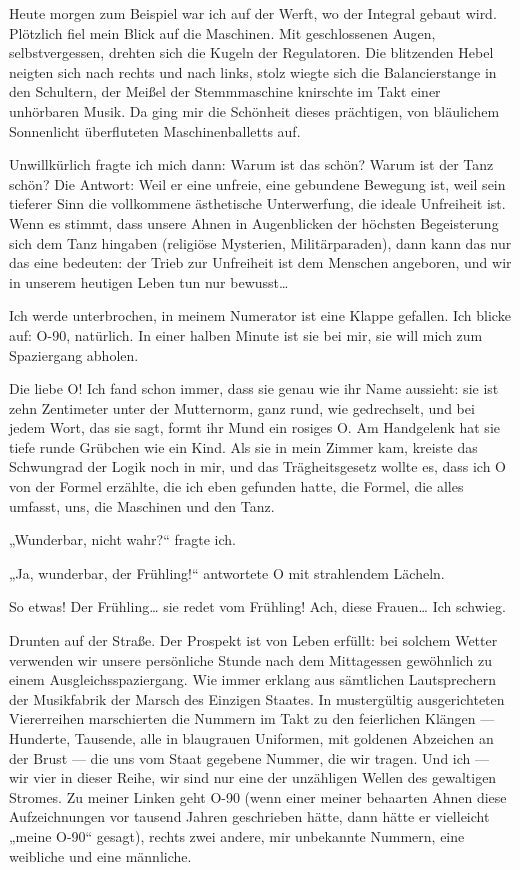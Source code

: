 Heute morgen zum Beispiel war ich auf der Werft, wo der Integral
gebaut wird. Plötzlich fiel mein Blick auf die Maschinen. Mit
geschlossenen Augen, selbstvergessen, drehten sich die Kugeln der
Regulatoren. Die blitzenden Hebel neigten sich nach rechts und nach
links, stolz wiegte sich die Balancierstange in den Schultern, der
Meißel der Stemmmaschine knirschte im Takt einer unhörbaren Musik.
Da ging mir die Schönheit dieses prächtigen, von bläulichem
Sonnenlicht überfluteten Maschinenballetts auf.

Unwillkürlich fragte ich mich dann: Warum ist das schön? Warum ist
der Tanz schön? Die Antwort: Weil er eine unfreie, eine gebundene
Bewegung ist, weil sein tieferer Sinn die vollkommene ästhetische
Unterwerfung, die ideale Unfreiheit ist. Wenn es stimmt, dass
unsere Ahnen in Augenblicken der höchsten Begeisterung sich dem
Tanz hingaben (religiöse Mysterien, Militärparaden), dann kann das
nur das eine bedeuten: der Trieb zur Unfreiheit ist dem Menschen
angeboren, und wir in unserem heutigen Leben tun nur bewusst\ldots{}

Ich werde unterbrochen, in meinem Numerator ist eine Klappe
gefallen. Ich blicke auf: O-90, natürlich. In einer halben Minute
ist sie bei mir, sie will mich zum Spaziergang abholen.

Die liebe O! Ich fand schon immer, dass sie genau wie ihr Name
aussieht: sie ist zehn Zentimeter unter der Mutternorm, ganz rund,
wie gedrechselt, und bei jedem Wort, das sie sagt, formt ihr Mund
ein rosiges O. Am Handgelenk hat sie tiefe runde Grübchen wie ein
Kind. Als sie in mein Zimmer kam, kreiste das Schwungrad der Logik
noch in mir, und das Trägheitsgesetz wollte es, dass ich O von der
Formel erzählte, die ich eben gefunden hatte, die Formel, die alles
umfasst, uns, die Maschinen und den Tanz.

„Wunderbar, nicht wahr?“
fragte ich.

 „Ja, wunderbar, der Frühling!“ antwortete O mit
strahlendem Lächeln.

So etwas! Der Frühling\ldots{} sie redet vom Frühling! Ach, diese
Frauen\ldots{} Ich schwieg.

Drunten auf der Straße. Der Prospekt ist von Leben erfüllt: bei
solchem Wetter verwenden wir unsere persönliche Stunde nach dem
Mittagessen gewöhnlich zu einem Ausgleichsspaziergang. Wie immer
erklang aus
sämtlichen Lautsprechern der Musikfabrik der Marsch des Einzigen
Staates. In mustergültig ausgerichteten Viererreihen marschierten
die Nummern im Takt zu den feierlichen Klängen — Hunderte,
Tausende, alle in blaugrauen Uniformen, mit goldenen Abzeichen an
der Brust — die uns vom Staat gegebene Nummer, die wir tragen. Und
ich — wir vier in dieser Reihe, wir sind nur eine der unzähligen
%
Wellen des gewaltigen Stromes. Zu meiner Linken geht O-90 (wenn
einer meiner behaarten Ahnen diese Aufzeichnungen vor tausend
Jahren geschrieben hätte, dann hätte er vielleicht „meine O-90“
gesagt), rechts zwei andere, mir unbekannte Nummern, eine weibliche
und eine männliche.

